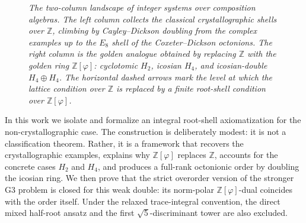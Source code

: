 \documentclass[12pt,oneside,english]{amsart}
\numberwithin{equation}{section}
\numberwithin{figure}{section}
\numberwithin{table}{section}
\theoremstyle{plain}
\theoremstyle{definition}
\theoremstyle{remark}
\newcommand{\ZZ}{\mathbb Z}
\newcommand{\Zphi}{\mathbb Z[\varphi]}
\begin{document}
\begin{figure}[htbp]
\caption{\emph{The two-column landscape of integer systems over composition algebras. The left column collects the classical crystallographic shells over $\ZZ$, climbing by Cayley--Dickson doubling from the complex examples up to the $E_8$ shell of the Coxeter--Dickson octonions. The right column is the golden analogue obtained by replacing $\ZZ$ with the golden ring $\Zphi$: cyclotomic $H_2$, icosian $H_4$, and icosian-double $H_4\oplus H_4$. The horizontal dashed arrows mark the level at which the lattice condition over $\ZZ$ is replaced by a finite root-shell condition over $\Zphi$.}}
\label{fig:nc-tower}
\end{figure}


In this work we isolate and formalize an integral root-shell axiomatization for the non-crystallographic case. The construction is deliberately modest: it is not a classification theorem. Rather, it is a framework that recovers the crystallographic examples, explains why \(\Zphi\) replaces \(\ZZ\), accounts for the concrete cases \(H_2\) and \(H_4\), and produces a full-rank octonionic order by doubling the icosian ring. We then prove that the strict overorder version of the stronger G3 problem is closed for this weak double: its norm-polar \(\Zphi\)-dual coincides with the order itself. Under the relaxed trace-integral convention, the direct mixed half-root ansatz and the first \(\sqrt5\)-discriminant tower are also excluded.
\end{document}
